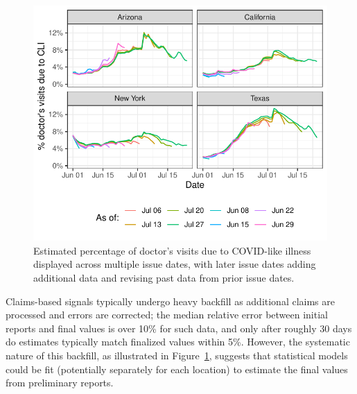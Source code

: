 \documentclass[9pt,twocolumn,twoside,lineno]{pnas-new}
\begin{document}
\begin{figure}[t]
  \includegraphics[width=\columnwidth]{fig/dv_as_of.pdf}
  \caption{Estimated percentage of doctor's visits due to COVID-like illness
    displayed across multiple issue dates, with later issue dates adding
    additional data and revising past data from prior issue dates.}
  \label{fig:dv_as_of}
\end{figure}

Claims-based signals typically undergo heavy backfill as additional claims are
processed and errors are corrected; the median relative error between initial
reports and final values is over 10\% for such data, and only after roughly 30
days do estimates typically match finalized values within 5\%. However, the
systematic nature of this backfill, as illustrated in Figure~\ref{fig:dv_as_of},
suggests that statistical models could be fit (potentially separately for each
location) to estimate the final values from preliminary reports.
\end{document}
